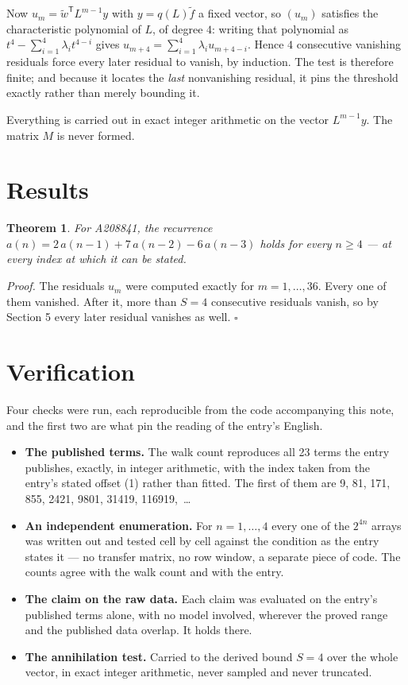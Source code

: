 \documentclass[11pt]{article}
\newtheorem{theorem}{Theorem}
\theoremstyle{definition}
\begin{document}
Now $u_m = \tilde w^{\mathsf T} L^{m-1} y$ with $y = q(L)\tilde f$ a fixed vector, so $(u_m)$ satisfies the characteristic polynomial of $L$, of degree $4$: writing that polynomial as $t^{4} - \sum_{i=1}^{4} \lambda_i t^{4-i}$ gives $u_{m+4} = \sum_{i=1}^{4} \lambda_i u_{m+4-i}$. Hence $4$ consecutive vanishing residuals force every later residual to vanish, by induction. The test is therefore finite; and because it locates the {\itshape last} nonvanishing residual, it pins the threshold exactly rather than merely bounding it.

Everything is carried out in exact integer arithmetic on the vector $L^{m-1}y$. The matrix $M$ is never formed.

\section{Results}

\begin{theorem} For A208841, the recurrence $a(n) = 2\,a(n-1) + 7\,a(n-2) - 6\,a(n-3)$ holds for every $n \ge 4$ --- at every index at which it can be stated.\end{theorem}

{\itshape Proof.} The residuals $u_m$ were computed exactly for $m = 1,\dots,36$. Every one of them vanished. After it, more than $S = 4$ consecutive residuals vanish, so by Section 5 every later residual vanishes as well. $\square$

\section{Verification}

Four checks were run, each reproducible from the code accompanying this note, and the first two are what pin the reading of the entry's English.

\begin{itemize}

\item {\bfseries The published terms.} The walk count reproduces all 23 terms the entry publishes, exactly, in integer arithmetic, with the index taken from the entry's stated offset (1) rather than fitted. The first of them are 9, 81, 171, 855, 2421, 9801, 31419, 116919,~\dots

\item {\bfseries An independent enumeration.} For $n = 1,\dots,4$ every one of the $2^{4n}$ arrays was written out and tested cell by cell against the condition as the entry states it --- no transfer matrix, no row window, a separate piece of code. The counts agree with the walk count and with the entry.

\item {\bfseries The claim on the raw data.} Each claim was evaluated on the entry's published terms alone, with no model involved, wherever the proved range and the published data overlap. It holds there.

\item {\bfseries The annihilation test.} Carried to the derived bound $S = 4$ over the whole vector, in exact integer arithmetic, never sampled and never truncated.

\end{itemize}
\end{document}
